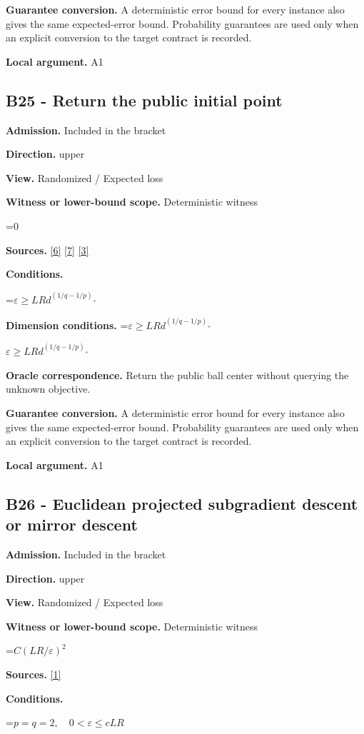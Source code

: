 \documentclass[10pt,a4paper]{article}
\newcommand{\AtlasMath}[1]{\par\begingroup\centering\setbox0=\hbox{$\displaystyle #1$}\ifdim\wd0>1.4\linewidth\typeout{ATLAS WIDE FORMULA: \the\wd0}\fi\ifdim\wd0>\linewidth\resizebox{\linewidth}{!}{\box0}\else\box0\fi\par\endgroup}
\newcommand{\AtlasInlineMath}[1]{\begingroup\setbox0=\hbox{$#1$}\ifdim\wd0>.4\linewidth\endgroup\AtlasMath{#1}\else\endgroup$#1$\fi}
\begin{document}
\textbf{Guarantee conversion.} A deterministic error bound for every instance also gives the same expected-error bound. Probability guarantees are used only when an explicit conversion to the target contract is recorded.

\textbf{Local argument.} A1

\subsection{B25 - Return the public initial point}
\textbf{Admission.} Included in the bracket

\textbf{Direction.} upper

\textbf{View.} Randomized / Expected loss

\textbf{Witness or lower-bound scope.} Deterministic witness

\AtlasMath{0}
\textbf{Sources.} \href{https://arxiv.org/pdf/1405.4980}{[6]} \href{https://www2.isye.gatech.edu/~nemirovs/MOR_AccuracyCertificates.pdf}{[7]} \href{https://arxiv.org/pdf/2609.20701}{[3]}

\textbf{Conditions.} 
\AtlasMath{\varepsilon\ge LRd^{(1/q-1/p)_+}}


\textbf{Dimension conditions.} \AtlasInlineMath{\varepsilon\ge LRd^{(1/q-1/p)_+}}

\textbf{Oracle correspondence.} Return the public ball center without querying the unknown objective.

\textbf{Guarantee conversion.} A deterministic error bound for every instance also gives the same expected-error bound. Probability guarantees are used only when an explicit conversion to the target contract is recorded.

\textbf{Local argument.} A1

\subsection{B26 - Euclidean projected subgradient descent or mirror descent}
\textbf{Admission.} Included in the bracket

\textbf{Direction.} upper

\textbf{View.} Randomized / Expected loss

\textbf{Witness or lower-bound scope.} Deterministic witness

\AtlasMath{C(LR/\varepsilon)^2}
\textbf{Sources.} \href{https://arxiv.org/pdf/1107.4080}{[1]}

\textbf{Conditions.} 
\AtlasMath{p=q=2,\quad0<\varepsilon\le cLR}
\end{document}
